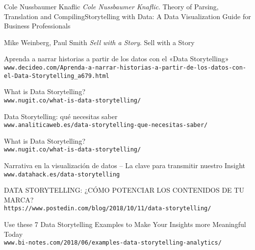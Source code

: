 \documentclass[11pt]{article}
\begin{document}
\begin{thebibliography}{9}
    Cole Nussbaumer Knaflic
    \textit{Cole Nussbaumer Knaflic}. 
    Theory of Parsing, Translation and CompilingStorytelling with Data: A Data Visualization Guide for Business Professionals
     
    Mike Weinberg, Paul Smith
    \textit{Sell with a Story}.
    Sell with a Story
     
    Aprenda a narrar historias a partir de los datos con el «Data Storytelling»
    \\\texttt{www.decideo.com/Aprenda-a-narrar-historias-a-partir-de-los-datos-con-el-Data-Storytelling_a679.html}
    
    
    What is Data Storytelling?
    \\\texttt{www.nugit.co/what-is-data-storytelling/}
    
    Data Storytelling: qué necesitas saber
    \\\texttt{www.analiticaweb.es/data-storytelling-que-necesitas-saber/}
    
    What is Data Storytelling?
    \\\texttt{www.nugit.co/what-is-data-storytelling/}
    
    Narrativa en la visualización de datos – La clave para transmitir nuestro Insight
    \\\texttt{www.datahack.es/data-storytelling}
    
    DATA STORYTELLING: ¿CÓMO POTENCIAR LOS CONTENIDOS DE TU MARCA?
    \\\texttt{https://www.postedin.com/blog/2018/10/11/data-storytelling/}
    
    Use these 7 Data Storytelling Examples to Make Your Insights more Meaningful Today
    \\\texttt{www.bi-notes.com/2018/06/examples-data-storytelling-analytics/}

    
    
    


\end{thebibliography}
\end{document}
